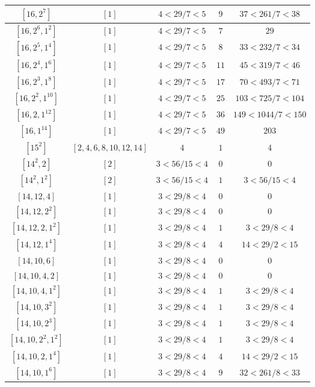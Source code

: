 \documentclass{article}%
\begin{document}
\begin{center}
\begin{longtable}{||c|c|c|c|c||}
$[16, 2^{7}]$ & $[1]$ & $4 < 29/7 < 5$ & $9$ & $37 < 261/7 < 38$ \\ \hline 
$[16, 2^{6}, 1^{2}]$ & $[1]$ & $4 < 29/7 < 5$ & $7$ & $29$ \\ \hline 
$[16, 2^{5}, 1^{4}]$ & $[1]$ & $4 < 29/7 < 5$ & $8$ & $33 < 232/7 < 34$ \\ \hline 
$[16, 2^{4}, 1^{6}]$ & $[1]$ & $4 < 29/7 < 5$ & $11$ & $45 < 319/7 < 46$ \\ \hline 
$[16, 2^{3}, 1^{8}]$ & $[1]$ & $4 < 29/7 < 5$ & $17$ & $70 < 493/7 < 71$ \\ \hline 
$[16, 2^{2}, 1^{10}]$ & $[1]$ & $4 < 29/7 < 5$ & $25$ & $103 < 725/7 < 104$ \\ \hline 
$[16, 2, 1^{12}]$ & $[1]$ & $4 < 29/7 < 5$ & $36$ & $149 < 1044/7 < 150$ \\ \hline 
$[16, 1^{14}]$ & $[1]$ & $4 < 29/7 < 5$ & $49$ & $203$ \\ \hline 
$[15^{2}]$ & $[2, 4, 6, 8, 10, 12, 14]$ & $4$ & $1$ & $4$ \\ \hline 
$[14^{2}, 2]$ & $[2]$ & $3 < 56/15 < 4$ & $0$ & $0$ \\ \hline 
$[14^{2}, 1^{2}]$ & $[2]$ & $3 < 56/15 < 4$ & $1$ & $3 < 56/15 < 4$ \\ \hline 
$[14, 12, 4]$ & $[1]$ & $3 < 29/8 < 4$ & $0$ & $0$ \\ \hline 
$[14, 12, 2^{2}]$ & $[1]$ & $3 < 29/8 < 4$ & $0$ & $0$ \\ \hline 
$[14, 12, 2, 1^{2}]$ & $[1]$ & $3 < 29/8 < 4$ & $1$ & $3 < 29/8 < 4$ \\ \hline 
$[14, 12, 1^{4}]$ & $[1]$ & $3 < 29/8 < 4$ & $4$ & $14 < 29/2 < 15$ \\ \hline 
$[14, 10, 6]$ & $[1]$ & $3 < 29/8 < 4$ & $0$ & $0$ \\ \hline 
$[14, 10, 4, 2]$ & $[1]$ & $3 < 29/8 < 4$ & $0$ & $0$ \\ \hline 
$[14, 10, 4, 1^{2}]$ & $[1]$ & $3 < 29/8 < 4$ & $1$ & $3 < 29/8 < 4$ \\ \hline 
$[14, 10, 3^{2}]$ & $[1]$ & $3 < 29/8 < 4$ & $1$ & $3 < 29/8 < 4$ \\ \hline 
$[14, 10, 2^{3}]$ & $[1]$ & $3 < 29/8 < 4$ & $1$ & $3 < 29/8 < 4$ \\ \hline 
$[14, 10, 2^{2}, 1^{2}]$ & $[1]$ & $3 < 29/8 < 4$ & $1$ & $3 < 29/8 < 4$ \\ \hline 
$[14, 10, 2, 1^{4}]$ & $[1]$ & $3 < 29/8 < 4$ & $4$ & $14 < 29/2 < 15$ \\ \hline 
$[14, 10, 1^{6}]$ & $[1]$ & $3 < 29/8 < 4$ & $9$ & $32 < 261/8 < 33$ \\ \hline 

\end{longtable}
\end{center}
\end{document}
